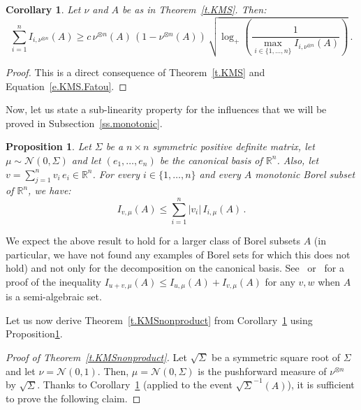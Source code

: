 \documentclass[11pt]{article}
\newtheorem{prop}[theo]{Proposition}
\newtheorem{coro}[theo]{Corollary}
\theoremstyle{definition}
\numberwithin{equation}{section}
\newcommand{\R}{\mathbb{R}}
\newcommand*\calN{\mathcal{N}}
\begin{document}
\begin{coro}\label{c.KMS}
Let $\nu$ and $A$ be as in Theorem~\ref{t.KMS}. Then:
\[
\sum_{i=1}^n I_{i,\nu^{\otimes n}}(A) \geq c \, \nu^{\otimes n}(A) \, (1-\nu^{\otimes n}(A)) \, \sqrt{\log_+ \left(\frac{1}{\max_{i \in \lbrace 1,\dots, n \rbrace} I_{i,\nu^{\otimes n}}(A)}\right) } \,.
\]
\end{coro}

\begin{proof}
This is a direct consequence of Theorem~\ref{t.KMS} and Equation~\eqref{e.KMS.Fatou}.
\end{proof}

Now, let us state a sub-linearity property for the influences that we will be proved in Subsection~\ref{ss.monotonic}.

\begin{prop}\label{p.sublin}
Let $\Sigma$ be a $n \times n$ symmetric positive definite matrix, let $\mu \sim \mathcal{N}(0,\Sigma)$ and let $\left(e_1,\dots, e_n \right)$ be the canonical basis of $\R^n$. Also, let $v = \sum_{j=1}^n v_i \, e_i \in \R^n$. For every $i \in \lbrace 1,\dots, n \rbrace$ and every $A$ monotonic Borel subset of $\R^n$, we have:
\begin{equation}\label{e.sublinrec}
I_{v,\mu}(A) \leq \sum_{i=1}^n |v_i| \, I_{i,\mu}(A) \,.
\end{equation}
\end{prop}

We expect the above result to hold for a larger class of Borel subsets $A$ (in particular, we have not found any examples of Borel sets for which this does not hold) and not only for the decomposition on the canonical basis. See~\cite[Chapter~7, Appendix~A]{alelele} or~\cite[Chapter~2, Appendix~A]{hugogogo} for a proof of the inequality $I_{u+v,\mu}(A)\leq I_{u,\mu}(A)+I_{v,\mu}(A)$ for any $v,w$ when $A$ is a semi-algebraic set.

Let us now derive Theorem~\ref{t.KMSnonproduct} from Corollary~\ref{c.KMS} using Proposition\ref{p.sublin}.

\begin{proof}[Proof of Theorem~\ref{t.KMSnonproduct}] Let $\sqrt{\Sigma}$ be a symmetric square root of $\Sigma$ and let $\nu=\mathcal{N}(0,1)$. Then, $\mu=\calN(0,\Sigma)$ is the pushforward measure of $\nu^{\otimes n}$ by $\sqrt{\Sigma}$. Thanks to Corollary~\ref{c.KMS} (applied to the event $\sqrt{\Sigma}^{-1}(A)$), it is sufficient to prove the following claim.
\end{proof}
\end{document}
